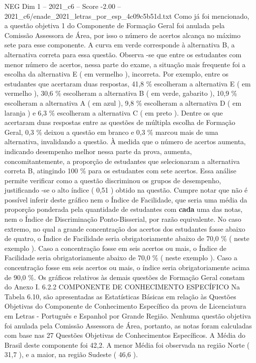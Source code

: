 \begin{textsample}{NEG Dim 1 – 2021\_c6 – Score -2.00 – 2021\_c6/enade\_2021\_letras\_por\_esp\_4c09c5b51d.txt}
Como já foi mencionado, a questão objetiva 1 do Componente de Formação Geral foi anulada pela Comissão Assessora de Área, por isso o número de acertos alcança no máximo sete para esse componente.
A curva em verde corresponde à alternativa B, a alternativa correta para essa questão.
Observa -se que entre os estudantes com menor número de acertos, nessa parte do exame, a situação mais frequente foi a escolha da alternativa E ( em vermelho ), incorreta.
Por exemplo, entre os estudantes que acertaram duas respostas, 41,8 \% escolheram a alternativa E ( em vermelho ), 30,6 \% escolheram a alternativa B ( em verde, gabarito ), 10,9 \% escolheram a alternativa A ( em azul ), 9,8 \% escolheram a alternativa D ( em laranja ) e 6,3 \% escolheram a alternativa C ( em preto ).
Dentre os que acertaram duas respostas entre as questões de múltipla escolha de Formação Geral, 0,3 \% deixou a questão em branco e 0,3 \% marcou mais de uma alternativa, invalidando a questão.
À medida que o número de acertos aumenta, indicando desempenho melhor nessa parte da prova, aumenta, concomitantemente, a proporção de estudantes que selecionaram a alternativa correta B, atingindo 100 \% para os estudantes com sete acertos.
Essa análise permite verificar como a questão discriminou os grupos de desempenho, justificando -se o alto índice ( 0,51 ) obtido na questão.
Cumpre notar que não é possível inferir deste gráfico nem o Índice de Facilidade, que seria uma média da proporção ponderada pela quantidade de estudantes com \textbf{cada} uma das notas, nem o Índice de Discriminação Ponto-Bisserial, por razão equivalente.
No caso extremo, no qual a grande concentração dos acertos dos estudantes fosse abaixo de quatro, o Índice de Facilidade seria obrigatoriamente abaixo de 70,0 \% ( neste exemplo ).
Caso a concentração fosse em seis acertos ou mais, o Índice de Facilidade seria obrigatoriamente abaixo de 70,0 \% ( neste exemplo ).
Caso a concentração fosse em seis acertos ou mais, o índice seria obrigatoriamente acima de 90,0 \%.
Os gráficos relativos às demais questões de Formação Geral constam do Anexo I. 6.2.2 COMPONENTE DE CONHECIMENTO ESPECÍFICO Na Tabela 6.10, são apresentadas as Estatísticas Básicas em relação às Questões Objetivas do Componente de Conhecimento Específico da prova de Licenciatura em Letras - Português e Espanhol por Grande Região.
Nenhuma questão objetiva foi anulada pela Comissão Assessora de Área, portanto, as notas foram calculadas com base nas 27 Questões Objetivas de Conhecimentos Específicos.
A Média do Brasil deste componente foi 42,2.
A menor Média foi observada na região Norte ( 31,7 ), e a maior, na região Sudeste ( 46,6 ).

\end{textsample}
